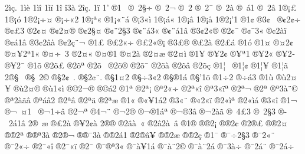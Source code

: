 {2^^ad^^ec^^e7.
1^^ad^^ec^^e8
1^^ad^^ec^^ee
1^^ad^^ec^^ef
1^^ad^^ee
^^ad^^ee3^^e0
2^^ad^^ee^^e7.
1^^ad^^ef
1^^ad'
^^ae1^^a0
^^ae^^a02^^a7^^f7
^^ae^^a02^^ac
^^ae^^a02^^ad
^^ae^^a02^^af
^^ae^^a02^^e0
^^ae^^a0^^e11
^^ae^^a02^^e2
1^^ae^^a1^^a3
1^^ae^^a1^^f3
1^^ae2^^a1^^f7^^a4
^^ae^^a1^^f7^^ab2
1^^ae^^a1^^aa^^ab
^^ae1^^a1^^ab^^a8^^e1
^^ae^^a13^^ab^^ec
1^^ae^^a1^^e1^^ab
1^^ae^^a1^^e2
1^^ae^^a1^^e5
1^^ae2^^a1'1
^^ae1^^a2
^^ae3^^a2^^a0
^^ae^^a22^^a2^^f7
^^ae^^a2^^a33^^ad
^^ae2^^a2^^a4
^^ae^^a22^^a4^^ae
^^ae^^a22^^a7^^a4
^^ae^^a2^^a82^^a73^^ad
^^ae^^a2^^a8^^e13^^ab
^^ae^^a2^^a8^^e11^^e2
^^ae3^^a22^^ab^^ae
^^ae2^^a2^^af
^^ae^^a2^^af3^^ab
^^ae^^a22^^e0^^ef
^^ae^^a2^^e11^^e2
^^ae3^^a22^^e2^^e0
^^ae^^a22^^e7^^a8^^ac
^^ae1^^a3
^^ae^^a32^^ab^^f7
^^ae^^a32^^ab^^ae^^a1
^^ae3^^a3^^ae
^^ae^^a32^^e0
^^ae2^^a3^^e1
^^ae1^^f3
^^ae1^^a4
^^ae^^a42^^a2
^^ae^^a4^^a52^^aa1^^ab
^^ae^^a4^^f7^^a03
^^ae2^^a4^^ab
^^ae^^a4^^ad^^ae1
^^ae^^a42^^e0
^^ae2^^a4^^e6
^^ae2^^a4^^ec
^^ae1^^a5
^^ae^^a52^^a2
^^ae^^a5^^aa1
^^ae^^a52^^ab
^^ae^^a52^^ad
^^ae^^a52^^af
^^ae1^^f5
^^ae2^^f5^^a3
^^ae2^^f5^^aa
^^ae2^^f5^^ad^^a0
^^ae2^^f5^^ad^^ae
^^ae2^^f5^^af
^^ae2^^f5^^e0
^^ae2^^f5^^e2
^^ae2^^f5^^e7
^^ae1^^a6^^a0
^^ae1^^a6^^a2
^^ae1^^a6^^a5
^^ae1^^a6^^e3
2^^ae^^a7^^a0
^^ae^^a7^^a02^^a9
^^ae^^a72^^a2^^a0.
^^ae^^a72^^a2^^a8.
^^ae^^a71^^a42
^^ae^^a7^^f73^^ab2
^^ae^^a7^^ae1^^e1
^^ae^^a7'1^^f5
^^ae1^^f72
^^ae^^f7^^ad^^e13
^^ae1^^f9
^^ae^^f92^^a4^^a5
^^ae^^f92^^a4^^ae
^^ae^^f91^^ab^^ec
^^ae^^a92^^ac^^ae
^^ae^^a9^^e12
^^ae1^^aa
^^ae2^^aa^^a1
^^ae^^aa2^^ab^^f7
^^ae2^^aa^^ab^^ee
^^ae^^aa3^^ab^^ef^^aa
^^ae2^^aa^^ac
^^ae2^^aa^^ad
^^ae^^aa3^^e0^^a8^^a9
^^ae^^aa2^^e0^^e3^^e2
^^ae^^aa^^e1^^e22
^^ae2^^aa^^e2
^^ae2^^aa^^e4
^^ae2^^aa^^e6
^^ae1^^ab
^^ae^^ab^^a51^^e12
^^ae3^^ab^^a8
^^ae^^ab2^^ab^^ef
^^ae2^^ab^^ec^^aa
^^ae2^^ab^^ec^^e1
^^ae3^^ab^^ee
^^ae1^^ac
^^ae^^ac^^a0^^ad^^a41^^a0
^^ae^^ac1^^f7^^ad^^e2
^^ae2^^ac^^aa
^^ae4^^ac^^ad^^a8
^^ae^^ac2^^ad^^ae
^^ae^^ac^^ae1^^e1^^aa
^^ae^^ac^^ae3^^e2
^^ae^^ac2^^e0^^e3
^^ae^^ad^^a04^^a33^^ad
^^ae^^ad^^a02^^a73
^^ae^^ad^^a02^^e11^^e2
2^^ae^^ad^^a0^^e6
^^ae^^ad^^a32^^e0
^^ae^^ad^^a52^^a2^^e0
2^^ae^^ad^^ae
^^ae^^ad2^^e2^^e0^^a0^^ab
^^ae^^ad2^^e22^^e0^^a0^^e2
^^ae1^^ae
^^ae^^ae2^^a1
^^ae^^ae2^^a2
^^ae2^^ae^^a3
^^ae^^ae2^^a4
^^ae^^ae2^^aa
^^ae^^ae^^aa3^^e0
^^ae2^^ae^^ac
^^ae^^ae^^af3^^e0
^^ae^^ae2^^e11
^^ae2^^ae^^e2^^a5
^^ae^^ae2^^e6
^^ae^^ae2^^e7
^^ae1^^af
^^ae^^af^^f72^^a73
^^ae^^af2^^ab^^a8
^^ae^^af2^^ab^^f7
^^ae2^^af^^ab^^ee
^^ae2^^af^^ab^^ef
^^ae2^^af^^ad
^^ae^^af^^ae^^aa3^^ab
^^ae^^af^^e0^^a51^^e1
^^ae^^af^^e0^^a82^^a9
^^ae^^af^^e0^^a82^^e1
^^ae^^af3^^e0^^f7
^^ae^^af2^^e1^^a8
^^ae^^af2^^e1^^f7
}
